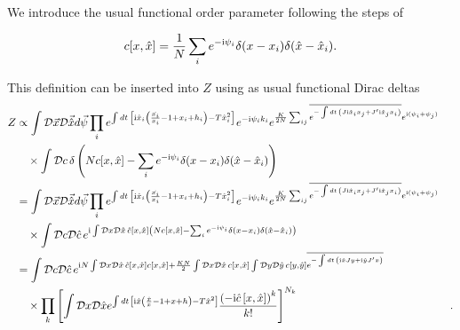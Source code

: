 \documentclass[
    preprint,
    linenumbers,
    amsmath,amssymb,amsfonts,
    aps, physrev,
    superscriptaddress,
    10pt,
    bibnotes
    ]{revtex4-2}
\begin{document}
We introduce the usual functional order parameter following the steps
of \cite{aguirre-lopezHeterogeneousMeanfieldAnalysis2024}

\begin{equation}
c[x,\hat{x}]=\frac{1}{N}\sum_{i}e^{-{\rm i}\psi_{i}}\delta(x-x_{i})\delta(\hat{x}-\hat{x}_{i}).
\end{equation}

This definition can be inserted into $Z$ using as usual functional
Dirac deltas
\begin{subequations}
\begin{align}
Z & \propto\int\mathcal{D}\vec{x}\mathcal{D}\vec{\hat{x}}d\vec{\psi}\prod_{i}e^{\int dt\,\left[{\rm i}\hat{x}_{i}\left(\frac{\dot{x_{i}}}{x_{i}}-1+x_{i}+h_{i}\right)-T\hat{x}_{i}^{2}\right]}e^{-{\rm i}\psi_{i}k_{i}}e^{\frac{K}{2N}\sum_{ij}\overline{e^{-\int dt\,\left(J{\rm i}\hat{x}_{i}x_{j}+J'{\rm i}\hat{x}_{j}x_{i}\right)}}e^{{\rm i}(\psi_{i}+\psi_{j})}}\nonumber \\
 & \quad\times\int\mathcal{D}c\,\delta\left(Nc[x,\hat{x}]-\sum_{i}e^{-{\rm i}\psi_{i}}\delta(x-x_{i})\delta(\hat{x}-\hat{x}_{i})\right)\\
 & =\int\mathcal{D}\vec{x}\mathcal{D}\vec{\hat{x}}d\vec{\psi}\prod_{i}e^{\int dt\,\left[{\rm i}\hat{x}_{i}\left(\frac{\dot{x_{i}}}{x_{i}}-1+x_{i}+h_{i}\right)-T\hat{x}_{i}^{2}\right]}e^{-{\rm i}\psi_{i}k_{i}}e^{\frac{K}{2N}\sum_{ij}\overline{e^{-\int dt\,\left(J{\rm i}\hat{x}_{i}x_{j}+J'{\rm i}\hat{x}_{j}x_{i}\right)}}e^{{\rm i}(\psi_{i}+\psi_{j})}}\nonumber \\
 & \quad\times\int\mathcal{D}c\mathcal{D}\hat{c}\,e^{{\rm i}\int\mathcal{D}x\mathcal{D}\hat{x}\,\hat{c}[x,\hat{x}]\left(Nc[x,\hat{x}]-\sum_{i}e^{-{\rm i}\psi_{i}}\delta(x-x_{i})\delta(\hat{x}-\hat{x}_{i})\right)}\\
 & =\int\mathcal{D}c\mathcal{D}\hat{c}\,e^{{\rm i}N\int\mathcal{D}x\mathcal{D}\hat{x}\,\hat{c}[x,\hat{x}]c[x,\hat{x}]+\frac{KN}{2}\int\mathcal{D}x\mathcal{D}\hat{x}\,c[x,\hat{x}]\int\mathcal{D}y\mathcal{D}\hat{y}\,c[y,\hat{y}]\overline{e^{-\int dt\,\left({\rm i}\hat{x}Jy+{\rm i}\hat{y}J'x\right)}}}\nonumber \\
 & \quad\times\prod_{k}\left[\int\mathcal{D}x\mathcal{D}\hat{x}e^{\int dt\,\left[{\rm i}\hat{x}\left(\frac{\dot{x}}{x}-1+x+h\right)-T\hat{x}^{2}\right]}\frac{\left(-{\rm i}\hat{c}\left[x,\hat{x}\right]\right)^{k}}{k!}\right]^{N_{k}} & .
\end{align}
\end{subequations}
\end{document}
